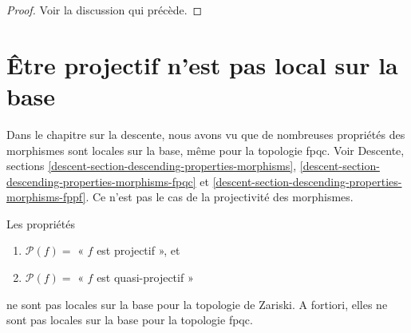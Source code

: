 \begin{proof}
Voir la discussion qui précède.
\end{proof}









\section{Être projectif n'est pas local sur la base}
\label{section-non-descending-property-projective}

\noindent
Dans le chapitre sur la descente, nous avons vu que de nombreuses propriétés des morphismes
sont locales sur la base, même pour la topologie fpqc. Voir
Descente, sections \ref{descent-section-descending-properties-morphisms},
\ref{descent-section-descending-properties-morphisms-fpqc} et
\ref{descent-section-descending-properties-morphisms-fppf}.
Ce n'est pas le cas de la projectivité des morphismes.

\begin{lemma}
\label{lemma-non-descending-property-projective}
Les propriétés
\begin{enumerate}
\item[] $\mathcal{P}(f) =$ « $f$ est projectif », et
\item[] $\mathcal{P}(f) =$ « $f$ est quasi-projectif »
\end{enumerate}
ne sont pas locales sur la base pour la topologie de Zariski. A fortiori, elles ne sont pas locales
sur la base pour la topologie fpqc.
\end{lemma}


